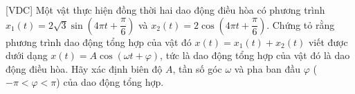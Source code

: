 \begin{bt}%
[VDC]%
	Một vật thực hiện đồng thời hai dao động điều hòa có phương trình $x_1(t) =2\sqrt{3} \sin \left(4\pi t+\dfrac{\pi}{6}\right)$ và $x_2(t) = 2\cos \left(4\pi t+\dfrac{\pi}{6}\right)$. Chứng tỏ rằng phương trình dao động tổng hợp của vật đó $x(t) = x_1(t)+x_2(t)$ viết được dưới dạng $x(t) = A\cos (\omega t + \varphi)$, tức là dao động tổng hợp của vật đó là dao động điều hòa. Hãy xác định biên độ $A$, tần số góc $\omega$ và pha ban đầu $\varphi$ ($-\pi<\varphi<\pi$) của dao động tổng hợp.
\end{bt}

